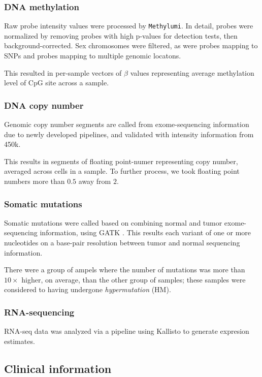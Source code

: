 \subsubsection{DNA methylation}
Raw probe intensity values were processed by
\texttt{Methylumi}\cite{davis_package_2013}. In detail, probes were
normalized by removing probes with high p-values for detection tests,
then background-corrected. Sex chromosomes were filtered, as were
probes mapping to SNPs and probes mapping to multiple genomic
locatons.

This resulted in per-sample vectors of $\beta$ values representing average methylation level
of CpG site across a sample.

\subsubsection{DNA copy number}

Genomic copy number segments are called from exome-sequencing
information due to newly developed pipelines, and validated with
intensity information from 450k.

This results in segments of floating point-numer representing copy
number, averaged across cells in a sample. To further process, we took
floating point numbers more than $0.5$ away from $2$.

\subsubsection{Somatic mutations}

Somatic mutations were called based on combining normal and tumor
exome-sequencing information, using GATK . This results
each variant of one or more nucleotides on a base-pair resolution
between tumor and normal sequencing information.

There were a group of ampels where the number of mutations was more than $10 \times$
higher, on average, than the other group of samples; these samples
were considered to having undergone \textit{hypermutation} (HM). 

\subsubsection{RNA-sequencing}

RNA-seq data was analyzed via a pipeline using
Kallisto\cite{bray_near-optimal_2016} to generate expresion
estimates. 

\subsection{Clinical information}

